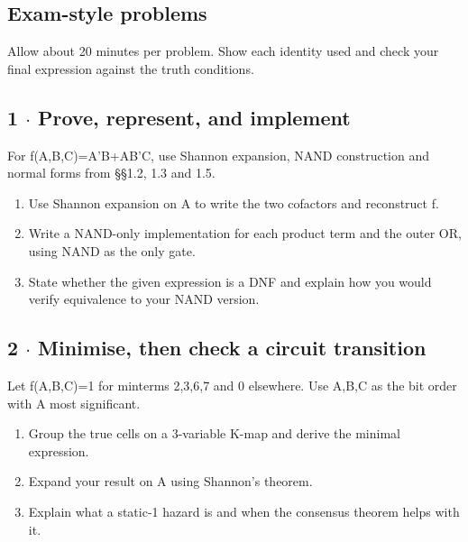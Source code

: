 \documentclass[11pt]{article}
\begin{document}
\begin{keepsection}
\section{Exam-style problems}

Allow about 20 minutes per problem. Show each identity used and check your final expression against the truth conditions.

\begin{keepsection}
\subsection{1 \ensuremath{\cdot} Prove, represent, and implement}

For f(A,B,C)=A'B+AB'C, use Shannon expansion, NAND construction and normal forms from §§1.2, 1.3 and 1.5.

\begin{enumerate}
\item Use Shannon expansion on A to write the two cofactors and reconstruct f.
\item Write a NAND-only implementation for each product term and the outer OR, using NAND as the only gate.
\item State whether the given expression is a DNF and explain how you would verify equivalence to your NAND version.
\end{enumerate}

\end{keepsection}

\begin{keepsection}
\subsection{2 \ensuremath{\cdot} Minimise, then check a circuit transition}

Let f(A,B,C)=1 for minterms 2,3,6,7 and 0 elsewhere. Use A,B,C as the bit order with A most significant.

\begin{enumerate}
\item Group the true cells on a 3-variable K-map and derive the minimal expression.
\item Expand your result on A using Shannon’s theorem.
\item Explain what a static-1 hazard is and when the consensus theorem helps with it.
\end{enumerate}

\end{keepsection}
\end{keepsection}
\end{document}
